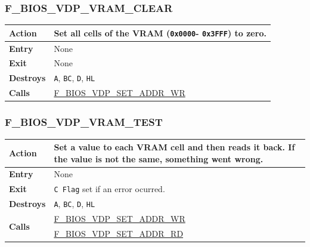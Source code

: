 \documentclass[a4paper,11pt]{article}
\begin{document}
        \subsubsection{F\_BIOS\_VDP\_VRAM\_CLEAR}
        \label{func:fbiosvdpvramclear}
        \begin{tabular}{l p{9cm}}
            \hline\textbf{Action}
            & Set all cells of the \textbf{VRAM} (\texttt{0x0000}-
            \texttt{0x3FFF}) to zero. \\
            \hline\textbf{Entry} & None\\
            \hline\textbf{Exit} & None\\
            \hline\textbf{Destroys} & \texttt{A}, \texttt{BC}, \texttt{D},
            \texttt{HL} \\
            \hline\textbf{Calls} & \hyperref[func:fbiosvdpsetaddrwr]
            {F\_BIOS\_VDP\_SET\_ADDR\_WR}\\
            \hline
        \end{tabular}

        \subsubsection{F\_BIOS\_VDP\_VRAM\_TEST}
        \label{func:fbiosvdpvramtest}
        \begin{tabular}{l p{9cm}}
            \hline\textbf{Action}
            & Set a value to each \textbf{VRAM} cell and then reads it back. If
            the value is not the same, something went wrong. \\
            \hline\textbf{Entry} & None\\
            \hline\textbf{Exit} & \texttt{C Flag} set if an error ocurred.\\
            \hline\textbf{Destroys} & \texttt{A}, \texttt{BC}, \texttt{D},
            \texttt{HL} \\
            \hline\multirow[t]{2}{4em}{\textbf{Calls}}
            & \hyperref[func:fbiosvdpsetaddrwr]{F\_BIOS\_VDP\_SET\_ADDR\_WR}\\
            & \hyperref[func:fbiosvdpsetaddrrd]{F\_BIOS\_VDP\_SET\_ADDR\_RD}\\
            \hline
        \end{tabular}
\end{document}
